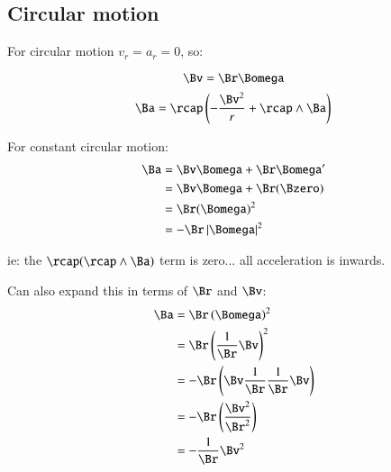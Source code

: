 \subsection{Circular motion}

For circular motion $v_r = a_r = 0$, so:

\[
\Bv = \Br \Bomega
\]
\[
\Ba = \rcap \left(  -\frac{\Bv^2}{r} + \rcap \wedge \Ba \right) \\
\]

For constant circular motion:
\begin{align*}
\Ba 
   &= \Bv\Bomega + \Br\Bomega' \\
   &= \Bv\Bomega + \Br(\Bzero) \\
   &= \Br(\Bomega)^2 \\
   &= -\Br\Abs{\Bomega}^2 \\
\end{align*}

ie: the $\rcap (\rcap \wedge \Ba )$ term is zero... all acceleration is inwards.

Can also expand this in terms of $\Br$ and $\Bv$:
\begin{align*}
\Ba 
   &= \Br\left(\Bomega\right)^2 \\
   &= \Br\left(\frac{1}{\Br}\Bv\right)^2 \\
   &= -\Br\left( \Bv \frac{1}{\Br} \frac{1}{\Br}\Bv \right) \\
   &= -\Br\left( \frac{\Bv^2}{\Br^2}\right) \\
   &= -\frac{1}{\Br}\Bv^2 \\
\end{align*}

